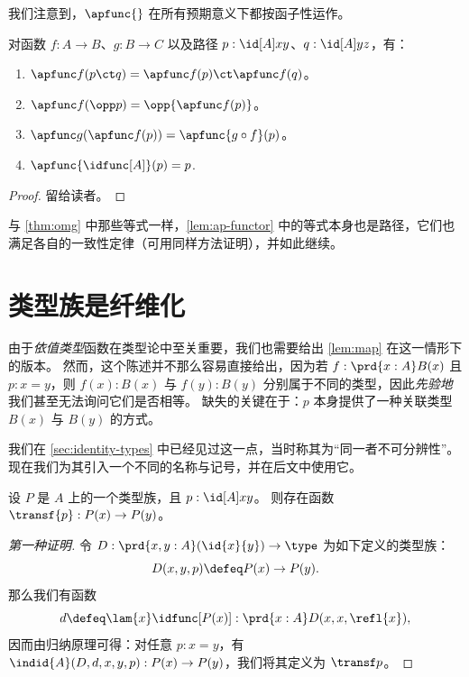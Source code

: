 我们注意到，$\apfunc{}$ 在所有预期意义下都按函子性运作。

\begin{lem}\label{lem:ap-functor}
  对函数 $f:A\to B$、$g:B\to C$ 以及路径 $p:\id[A]xy$、$q:\id[A]yz$，有：
  \begin{enumerate}
  \item $\apfunc f(p\ct q) = \apfunc f(p) \ct \apfunc f(q)$。\label{item:apfunctor-ct}
  \item $\apfunc f(\opp p) = \opp{\apfunc f (p)}$。\label{item:apfunctor-opp}
  \item $\apfunc g (\apfunc f(p)) = \apfunc{g\circ f} (p)$。\label{item:apfunctor-compose}
  \item $\apfunc {\idfunc[A]} (p) = p$.
  \end{enumerate}
\end{lem}
\begin{proof}
  留给读者。
\end{proof}
%

与 \cref{thm:omg} 中那些等式一样，\cref{lem:ap-functor} 中的等式本身也是路径，它们也满足各自的一致性定律（可用同样方法证明），并如此继续。
\section{类型族是纤维化}
\label{sec:fibrations}

%
%
由于\emph{依值类型}函数在类型论中至关重要，我们也需要给出 \cref{lem:map} 在这一情形下的版本。
然而，这个陈述并不那么容易直接给出，因为若 $f:\prd{x:A} B(x)$ 且 $p:x=y$，则 $f(x):B(x)$ 与 $f(y):B(y)$ 分别属于不同的类型，因此\emph{先验地}我们甚至无法询问它们是否相等。
缺失的关键在于：$p$ 本身提供了一种关联类型 $B(x)$ 与 $B(y)$ 的方式。

我们在 \autoref{sec:identity-types} 中已经见过这一点，当时称其为“同一者不可分辨性”。
%
现在我们为其引入一个不同的名称与记号，并在后文中使用它。

\begin{lem}[传送]\label{lem:transport}
  设 $P$ 是 $A$ 上的一个类型族，且 $p:\id[A]xy$。
  则存在函数 $\transf{p}:P(x)\to P(y)$。
\end{lem}

\begin{proof}[第一种证明]
  令 $D:\prd{x,y:A} (\id{x}{y}) \to \type$ 为如下定义的类型族：
  \[D(x,y,p)\defeq P(x)\to P(y).\]
  那么我们有函数
  \begin{equation*}
    d\defeq\lam{x} \idfunc[P(x)]:\prd{x:A} D(x,x,\refl{x}),
  \end{equation*}
  因而由归纳原理可得：对任意 $p:x= y$，有 $\indid{A}(D,d,x,y,p):P(x)\to P(y)$，我们将其定义为 $\transf p$。
\end{proof}


